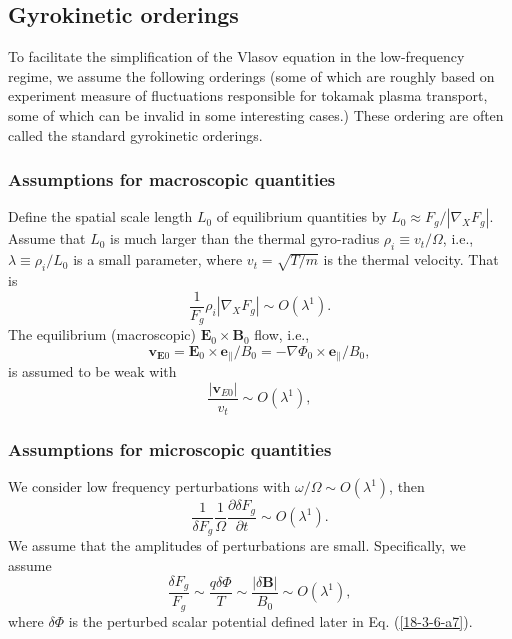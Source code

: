 \documentclass{llncs}
\begin{document}
\subsection{Gyrokinetic orderings}

To facilitate the simplification of the Vlasov equation in the low-frequency
regime, we assume the following orderings (some of which are roughly based on
experiment measure of fluctuations responsible for tokamak plasma transport,
some of which can be invalid in some interesting cases.) These ordering are
often called the standard gyrokinetic orderings.

\subsubsection{Assumptions for macroscopic quantities}

Define the spatial scale length $L_0$ of equilibrium quantities by $L_0
\approx F_g / | \nabla_X F_g |$. Assume that $L_0$ is much larger than the
thermal gyro-radius $\rho_i \equiv v_t / \Omega$, i.e., $\lambda \equiv \rho_i
/ L_0$ is a small parameter, where $v_t = \sqrt{T / m}$ is the thermal
velocity. That is
\begin{equation}
  \label{17-5-15-1} \frac{1}{F_g} \rho_i | \nabla_X F_g | \sim O (\lambda^1) .
\end{equation}
The equilibrium (macroscopic) $\mathbf{E}_0 \times \mathbf{B}_0$ flow, i.e.,
\begin{equation}
  \mathbf{v}_{\mathbf{E}0} =\mathbf{E}_0 \times \mathbf{e}_{\parallel} / B_0 =
  - \nabla \Phi_0 \times \mathbf{e}_{\parallel} / B_0,
\end{equation}
is assumed to be weak with
\begin{equation}
  \frac{| \mathbf{v}_{E 0} |}{v_t} \sim O (\lambda^1),
\end{equation}

\subsubsection{Assumptions for microscopic quantities}

We consider low frequency perturbations with $\omega / \Omega \sim O
(\lambda^1)$, then
\begin{equation}
  \frac{1}{\delta F_g} \frac{1}{\Omega} \frac{\partial \delta F_g}{\partial t}
  \sim O (\lambda^1) .
\end{equation}
We assume that the amplitudes of perturbations are small. Specifically, we
assume
\begin{equation}
  \frac{\delta F_g}{F_g} \sim \frac{q \delta \Phi}{T} \sim \frac{| \delta
  \mathbf{B} |}{B_0} \sim O (\lambda^1),
\end{equation}
where $\delta \Phi$ is the perturbed scalar potential defined later in Eq.
(\ref{18-3-6-a7}).
\end{document}
